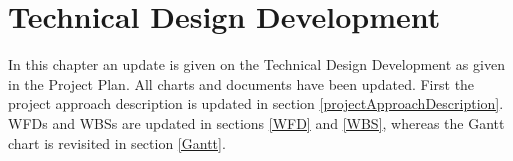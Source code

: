 \chapter{Technical Design Development}
\label{technDesignDev}
In this chapter an update is given on the Technical Design Development as given in the Project Plan. All charts and documents have been updated. First the project approach description is updated in section \ref{projectApproachDescription}. \acl{WFD}s and \acl{WBS}s are updated in sections \ref{WFD} and \ref{WBS}, whereas the Gantt chart is revisited in section \ref{Gantt}.


